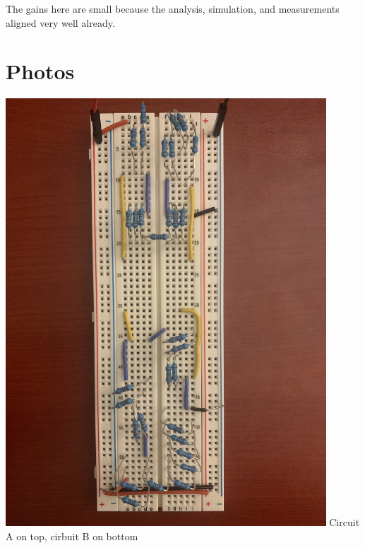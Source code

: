 \documentclass[12pt]{article}
\begin{document}
The gains here are small because the analysis, simulation, and measurements aligned very well already.

\section{Photos}

\begin{center}
	\includegraphics[width=0.9\textwidth]{res/IMG_0149.jpg}
	\newline
	Circuit A on top, cirbuit B on bottom
\end{center}

\clearpage
\end{document}
